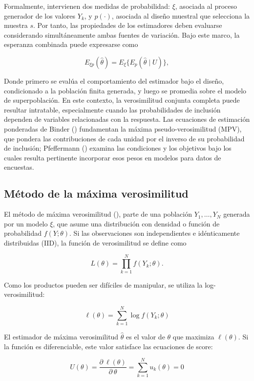\documentclass[
  spanish,
  11pt,
  letterpaper,
  oneside,
  open=any]{scrbook}
\begin{document}
Formalmente, intervienen dos medidas de probabilidad: \(\xi\), asociada
al proceso generador de los valores \(Y_k\), y \(p(\cdot)\), asociada al
diseño muestral que selecciona la muestra \(s\). Por tanto, las
propiedades de los estimadores deben evaluarse considerando
simultáneamente ambas fuentes de variación. Bajo este marco, la
esperanza combinada puede expresarse como

\[
E_{\xi p}(\hat{\theta})
= E_{\xi}\{E_p(\hat{\theta}\mid U)\},
\]

Donde primero se evalúa el comportamiento del estimador bajo el diseño,
condicionado a la población finita generada, y luego se promedia sobre
el modelo de superpoblación. En este contexto, la verosimilitud conjunta
completa puede resultar intratable, especialmente cuando las
probabilidades de inclusión dependen de variables relacionadas con la
respuesta. Las ecuaciones de estimación ponderadas de Binder
() fundamentan la máxima
pseudo-verosimilitud (MPV), que pondera las contribuciones de cada
unidad por el inverso de su probabilidad de inclusión; Pfeffermann
() examina las condiciones y los
objetivos bajo los cuales resulta pertinente incorporar esos pesos en
modelos para datos de encuestas.

\subsection{Método de la máxima verosimilitud}\label{sec-mv}

El método de máxima verosimilitud
(), parte de una
población \(Y_1,\ldots,Y_N\) generada por un modelo \(\xi\), que asume
una distribución con densidad o función de probabilidad \(f(Y;\theta)\).
Si las observaciones son independientes e idénticamente distribuidas
(IID), la función de verosimilitud se define como

\[
L(\theta)
= \prod_{k=1}^{N} f(Y_k;\theta).
\]

Como los productos pueden ser difíciles de manipular, se utiliza la
log-verosimilitud:

\[
\ell(\theta)
= \sum_{k=1}^{N}\log f(Y_k;\theta)
\]

El estimador de máxima verosimilitud \(\hat{\theta}\) es el valor de
\(\theta\) que maximiza \(\ell(\theta)\). Si la función es
diferenciable, este valor satisface las ecuaciones de score:

\[
U(\theta)
= \frac{\partial \ \ell(\theta)}{\partial \ \theta}
= \sum_{k=1}^{N} u_k(\theta)
= 0
\]
\end{document}
